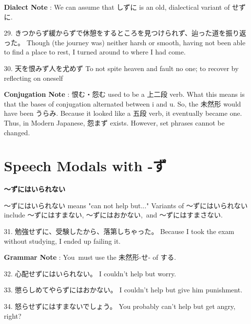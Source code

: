 \par{\textbf{Dialect Note }: We can assume that しずに is an old, dialectical variant of せずに. }

\par{29. きつからず緩からずで休憩をするところを見つけられず、辿った道を振り返った。 \hfill\break
Though (the journey was) neither harsh or smooth, having not been able to find a place to rest, I turned around to where I had come.  }

\par{30. 天を恨みず人を尤めず \hfill\break
To not spite heaven and fault no one; to recover by reflecting on oneself }

\par{\textbf{Conjugation Note }: 恨む・怨む used to be a 上二段 verb. What this means is that the bases of conjugation alternated between i and u. So, the 未然形 would have been うらみ. Because it looked like a 五段 verb, it eventually became one. Thus, in Modern Japanese, 怨まず exists. However, set phrases cannot be changed. }
      
\section{Speech Modals with -ず}
 
\par{\textbf{～ずにはいられない }}

\par{ ～ずにはいられない means "can  not help but\dothyp{}\dothyp{}\dothyp{}" Variants of ～ずにはいられない include ～ずにはすまない, ～ずにはおかない, and ～ずにはすまさない. }

\par{31. 勉強せずに、受験したから、落第しちゃった。 \hfill\break
Because I took the exam without studying, I ended up failing it. }

\par{\textbf{Grammar Note }: You must use the 未然形-せ- of する. }

\par{32. 心配せずにはいられない。 \hfill\break
I couldn't help but worry. }

\par{33. 懲らしめてやらずにはおかない。 \hfill\break
I couldn't help but give him punishment. }

\par{34. 怒らせずにはすまないでしょう。 \hfill\break
You probably can't help but get angry, right? }

